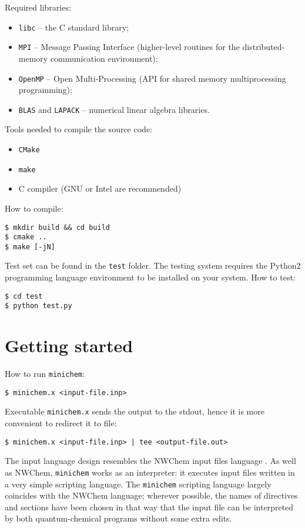 \documentclass[a4paper, 12pt]{article}
\begin{document}
Required libraries:

\begin{itemize}
\item \texttt{libc} -- the C standard library;
\item \texttt{MPI} -- Message Passing Interface (higher-level routines for the distributed-memory communication environment);
\item \texttt{OpenMP} -- Open Multi-Processing (API for shared memory multiprocessing programming);
\item \texttt{BLAS} and \texttt{LAPACK} -- numerical linear algebra libraries.
\end{itemize}

Tools needed to compile the source code:
\begin{itemize}
\item \texttt{CMake}
\item \texttt{make}
\item C compiler (GNU or Intel are recommended)
\end{itemize}

How to compile:

\begin{lstlisting}
$ mkdir build && cd build
$ cmake ..
$ make [-jN]
\end{lstlisting}

Test set can be found in the \texttt{test} folder. The testing system requires the Python2 programming language environment to be installed on your system. How to test:

\begin{lstlisting}
$ cd test
$ python test.py
\end{lstlisting}


\section{Getting started}

How to run \texttt{minichem}:
\begin{lstlisting}
$ minichem.x <input-file.inp>
\end{lstlisting}

Executable \texttt{minichem.x} sends the output to the stdout, hence it is more convenient to redirect it to file:

\begin{lstlisting}
$ minichem.x <input-file.inp> | tee <output-file.out>
\end{lstlisting}

The input language design resembles the NWChem input files language \cite{nwchem2010}. As well as NWChem, \texttt{minichem} works as an interpreter: it executes input files written in a very simple scripting language. The \texttt{minichem} scripting language largely coincides with the NWChem language; 
wherever possible, the names of directives and sections have been chosen in that way that the input file can be interpreted by both quantum-chemical programs without some extra edits.
\end{document}

